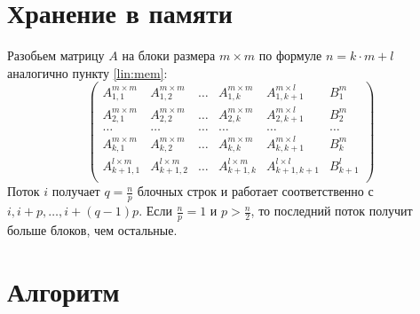 \documentclass[12pt]{report}
\begin{document}
        \section{Хранение в памяти} \label{thread:mem}
        \quad Разобьем матрицу $A$ на блоки размера $m \times m$ 
        по формуле $ n = k \cdot m + l $ аналогично пункту \ref{lin:mem}:
        \[
        \left(
        \begin{array}{ccccc|c}
            A_{1,1}^{m \times m}   & A_{1,2}^{m \times m}   & \ldots & A_{1,k}^{m \times m}   & A_{1,k+1}^{m \times l}    & B^{m}_{1}   \\
            A_{2,1}^{m \times m}   & A_{2,2}^{m \times m}   & \ldots & A_{2,k}^{m \times m}   & A_{2,k+1}^{m \times l}    & B^{m}_{2}   \\
            \ldots                 & \ldots                 & \ldots & \ldots                 & \ldots                    & \ldots      \\
            A_{k,1}^{m \times m}   & A_{k,2}^{m \times m}   & \ldots & A_{k,k}^{m \times m}   & A_{k,k+1}^{m \times l}    & B^{m}_{k}   \\
            A_{k+1,1}^{l \times m} & A_{k+1,2}^{l \times m} & \ldots & A_{k+1,k}^{l \times m} & A_{k+1, k+1}^{l \times l} & B^{l}_{k+1} \\
        \end{array}
        \right)
        \]
        Поток $i$ получает $q = \frac{n}{p}$ блочных строк и работает соответственно с $i, i + p, \ldots, i + (q - 1)p $. Если $\frac{n}{p} = 1$ и $p > \frac{n}{2}$, то
        последний поток получит больше блоков, чем остальные.


        \section{Алгоритм} \label{thread:alg}
\end{document}
